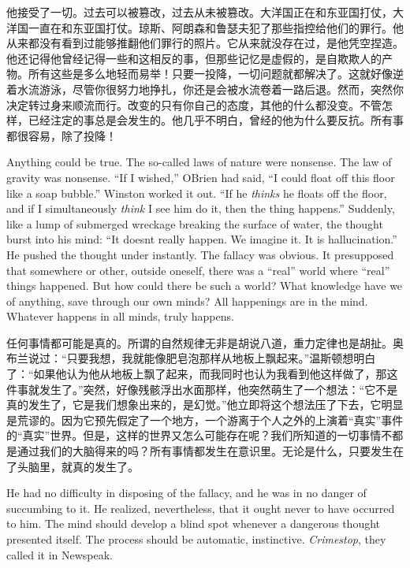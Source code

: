 \begin{paracol}{2}
\switchcolumn

他接受了一切。过去可以被篡改，过去从未被篡改。大洋国正在和东亚国打仗，大洋国一直在和东亚国打仗。琼斯、阿朗森和鲁瑟夫犯了那些指控给他们的罪行。他从来都没有看到过能够推翻他们罪行的照片。它从来就没存在过，是他凭空捏造。他还记得他曾经记得一些和这相反的事，但那些记忆是虚假的，是自欺欺人的产物。所有这些是多么地轻而易举！只要一投降，一切问题就都解决了。这就好像逆着水流游泳，尽管你很努力地挣扎，你还是会被水流卷着一路后退。然而，突然你决定转过身来顺流而行。改变的只有你自己的态度，其他的什么都没变。不管怎样，已经注定的事总是会发生的。他几乎不明白，曾经的他为什么要反抗。所有事都很容易，除了投降！

\switchcolumn*

Anything could be true. The so-called laws of nature were nonsense. The
law of gravity was nonsense. ``If I wished,'' O\textquotesingle Brien had
said, ``I could float off this floor like a soap bubble.'' Winston worked
it out. ``If he \emph{thinks} he floats off the floor, and if I
simultaneously \emph{think} I see him do it, then the thing happens.''
Suddenly, like a lump of submerged wreckage breaking the surface of
water, the thought burst into his mind: ``It doesn\textquotesingle t
really happen. We imagine it. It is hallucination.'' He pushed the
thought under instantly. The fallacy was obvious. It presupposed that
somewhere or other, outside oneself, there was a ``real'' world where
``real'' things happened. But how could there be such a world? What
knowledge have we of anything, save through our own minds? All
happenings are in the mind. Whatever happens in all minds, truly
happens.

\switchcolumn

任何事情都可能是真的。所谓的自然规律无非是胡说八道，重力定律也是胡扯。奥布兰说过：``只要我想，我就能像肥皂泡那样从地板上飘起来。''温斯顿想明白了：``如果他认为他从地板上飘了起来，而我同时也认为我看到他这样做了，那这件事就发生了。''突然，好像残骸浮出水面那样，他突然萌生了一个想法：``它不是真的发生了，它是我们想象出来的，是幻觉。''他立即将这个想法压了下去，它明显是荒谬的。因为它预先假定了一个地方，一个游离于个人之外的上演着``真实''事件的``真实''世界。但是，这样的世界又怎么可能存在呢？我们所知道的一切事情不都是通过我们的大脑得来的吗？所有事情都发生在意识里。无论是什么，只要发生在了头脑里，就真的发生了。

\switchcolumn*

He had no difficulty in disposing of the fallacy, and he was in no
danger of succumbing to it. He realized, nevertheless, that it ought
never to have occurred to him. The mind should develop a blind spot
whenever a dangerous thought presented itself. The process should be
automatic, instinctive. \emph{Crimestop}, they called it in Newspeak.


\end{paracol}
